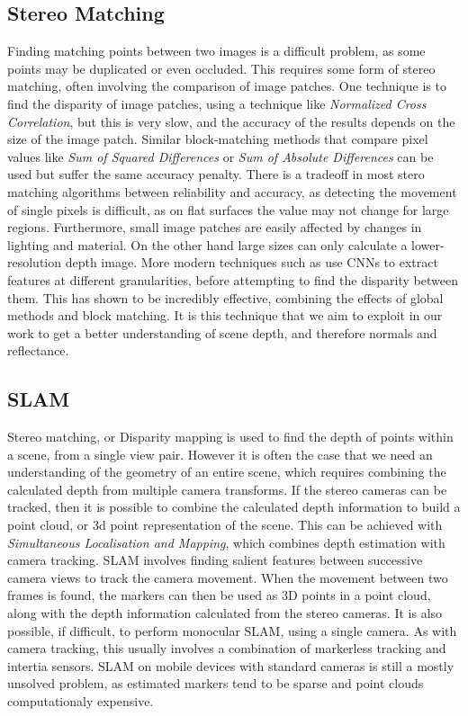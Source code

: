 \documentclass[ %
                    author={Gavin Parker},
                supervisor={Dr. Neill Campbell},
                    degree={MEng},
                     title={Deep Siamese Networks for Illumination Estimation from Stereo Images},
                  subtitle={},
                      type={research},
                      year={2018} ]{dissertation}
\begin{document}
\subsection{Stereo Matching}
Finding matching points between two images is a difficult problem, as some points may be duplicated or even occluded. This requires some form of stereo matching, often involving the comparison of image patches. One technique is to find the disparity of image patches, using a technique like \textit{Normalized Cross Correlation}, but this is very slow, and the accuracy of the results depends on the size of the image patch. Similar block-matching methods that compare pixel values like \textit{Sum of Squared Differences} or \textit{Sum of Absolute Differences} can be used but suffer the same accuracy penalty. There is a tradeoff in most stero matching algorithms between reliability and accuracy, as detecting the movement of single pixels is difficult, as on flat surfaces the value may not change for large regions. Furthermore, small image patches are easily affected by changes in lighting and material. On the other hand large sizes can only calculate a lower-resolution depth image. More modern techniques such as \cite{7780983} use CNNs to extract features at different granularities, before attempting to find the disparity between them. This has shown to be incredibly effective, combining the effects of global methods and block matching. It is this technique that we aim to exploit in our work to get a better understanding of scene depth, and therefore normals and reflectance.
\subsection{SLAM}
Stereo matching, or Disparity mapping is used to find the depth of points within a scene, from a single view pair. However it is often the case that we need an understanding of the geometry of an entire scene, which requires combining the calculated depth from multiple camera transforms. If the stereo cameras can be tracked, then it is possible to combine the calculated depth information to build a point cloud, or 3d point representation of the scene. This can be achieved with \textit{Simultaneous Localisation and Mapping}, which combines depth estimation with camera tracking. SLAM involves finding salient features between successive camera views to track the camera movement. When the movement between two frames is found, the markers can then be used as 3D points in a point cloud, along with the depth information calculated from the stereo cameras. It is also possible, if difficult, to perform monocular SLAM, using a single camera. As with camera tracking, this usually involves a combination of markerless tracking and intertia sensors. SLAM on mobile devices with standard cameras is still a mostly unsolved problem, as estimated markers tend to be sparse and point clouds computationaly expensive.
\end{document}
